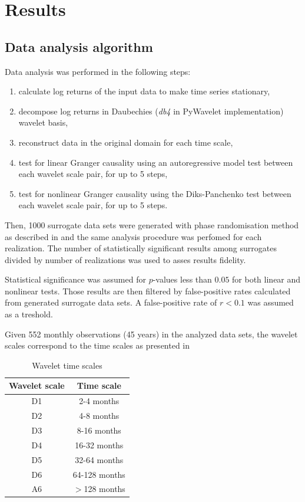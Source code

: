 \section{Results} \label{sec:results}

\subsection{Data analysis algorithm} \label{sec:results-algorithm}

Data analysis was performed in the following steps:
\begin{enumerate}
\item calculate log returns of the input data to make time series stationary,
\item decompose log returns in Daubechies (\emph{db4} in PyWavelet implementation) wavelet basis,
\item reconstruct data in the original domain for each time scale,
\item test for linear Granger causality using an autoregressive model test between each wavelet scale pair, for up to 5 steps,
\item test for nonlinear Granger causality using the Diks-Panchenko test between each wavelet scale pair, for up to 5 steps.
\end{enumerate}

Then, 1000 surrogate data sets were generated with phase randomisation method as described in  and the same analysis procedure was perfomed for each realization.
The number of statistically significant results among surrogates divided by number of realizations was used to asses results fidelity.

Statistical significance was assumed for $p$-values less than $0.05$ for both linear and nonlinear tests.
Those results are then filtered by false-positive rates calculated from generated surrogate data sets.
A false-positive rate of $r<0.1$ was assumed as a treshold.

Given 552 monthly observations (45 years) in the analyzed data sets, the wavelet scales correspond to the time scales as presented in  

\begin{table}[h]
\begin{center}
\begin{tabular}{c|c}
\hline\hline
Wavelet scale & Time scale \\
\hline
D1 & 2-4 months \\
D2 & 4-8 months \\
D3 & 8-16 months \\
D4 & 16-32 months \\
D5 & 32-64 months \\
D6 & 64-128 months \\
A6 & $>$128 months \\
\hline\hline
\end{tabular}
\end{center}
\caption{Wavelet time scales}
\label{tab:scales}
\end{table}

